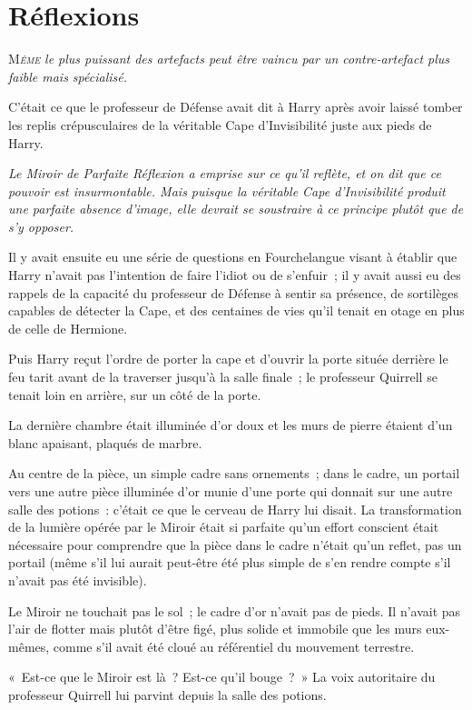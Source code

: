 \chapter{Réflexions}

\lettrine{M}{\emph{ême}} \emph{le plus puissant des artefacts peut être vaincu par un contre-artefact plus faible mais spécialisé.}

C'était ce que le professeur de Défense avait dit à Harry après avoir laissé tomber les replis crépusculaires de la véritable Cape d'Invisibilité juste aux pieds de Harry.

\emph{Le Miroir de Parfaite Réflexion a emprise sur ce qu'il reflète, et on dit que ce pouvoir est insurmontable.
Mais puisque la véritable Cape d'Invisibilité produit une parfaite absence d'image, elle devrait se soustraire à ce principe plutôt que de s'y opposer.}

Il y avait ensuite eu une série de questions en Fourchelangue visant à établir que Harry n'avait pas l'intention de faire l'idiot ou de s'enfuir~; il y avait aussi eu des rappels de la capacité du professeur de Défense à sentir sa présence, de sortilèges capables de détecter la Cape, et des centaines de vies qu'il tenait en otage en plus de celle de Hermione.

Puis Harry reçut l'ordre de porter la cape et d'ouvrir la porte située derrière le feu tarit avant de la traverser jusqu'à la salle finale~; le professeur Quirrell se tenait loin en arrière, sur un côté de la porte.

La dernière chambre était illuminée d'or doux et les murs de pierre étaient d'un blanc apaisant, plaqués de marbre.

Au centre de la pièce, un simple cadre sans ornements~; dans le cadre, un portail vers une autre pièce illuminée d'or munie d'une porte qui donnait sur une autre salle des potions~: c'était ce que le cerveau de Harry lui disait.
La transformation de la lumière opérée par le Miroir était si parfaite qu'un effort conscient était nécessaire pour comprendre que la pièce dans le cadre n'était qu'un reflet, pas un portail (même s'il lui aurait peut-être été plus simple de s'en rendre compte s'il n'avait pas été invisible).

Le Miroir ne touchait pas le sol~; le cadre d'or n'avait pas de pieds.
Il n'avait pas l'air de flotter mais plutôt d'être figé, plus solide et immobile que les murs eux-mêmes, comme s'il avait été cloué au référentiel du mouvement terrestre.

«~Est-ce que le Miroir est là~?
Est-ce qu'il bouge~?~»
La voix autoritaire du professeur Quirrell lui parvint depuis la salle des potions.

